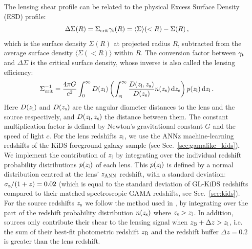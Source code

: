 \documentclass[usenatbib]{mnras}
\newcommand*{\meanb}[1]{\langle{#1}\rangle}
\newcommand{\un}[1]{_{\rm #1}}
\begin{document}
The lensing shear profile can be related to the physical Excess Surface Density (ESD) profile:
\begin{equation}
	\Delta \Sigma (R) = \Sigma\un{crit} \gamma\un{t}(R) = \meanb{\Sigma}(<R) - \Sigma(R) \, ,
	\label{eq:deltasigma}
\end{equation}
which is the surface density $\Sigma(R)$ at projected radius $R$, subtracted from the average surface density $\meanb{\Sigma(<R)}$ within $R$. The conversion factor between $\gamma\un{t}$ and $\Delta\Sigma$ is the critical surface density, whose inverse is also called the lensing efficiency:
\begin{equation}
	\Sigma\un{crit}^{-1} = \frac{4\pi G}{c^2} \int_{0}^{\infty} D(z\un{l}) \left( \int_{z\un{l}}^{\infty}  \frac{D(z\un{l}, z\un{s})}{D(z\un{s})} n(z\un{s}) \, {\rm d} z\un{s} \right) p(z\un{l}) \, {\rm d} z\un{l} \, .
	\label{eq:sigmacrit}
\end{equation}
Here $D(z\un{l})$ and $D(z\un{s})$ are the angular diameter distances to the lens and the source respectively, and $D(z\un{l}, z\un{s})$ the distance between them. The constant multiplication factor is defined by Newton's gravitational constant $G$ and the speed of light $c$. For the lens redshifts $z\un{l}$, we use the ANNz machine-learning redshifts of the KiDS foreground galaxy sample (see Sec.~\ref{sec:gamalike_kids}). We implement the contribution of $z\un{l}$ by integrating over the individual redshift probability distributions $p(z\un{l})$ of each lens. This $p(z\un{l})$ is defined by a normal distribution centred at the lens' $z\un{ANN}$ redshift, with a standard deviation: $\sigma\un{z}/(1+z) = 0.02$ (which is equal to the standard deviation of GL-KiDS redshifts compared to their matched spectroscopic GAMA redshifts, see Sec.~\ref{sec:kids}). For the source redshifts $z\un{s}$ we follow the method used in \cite{dvornik2018}, by integrating over the part of the redshift probability distribution $n(z\un{s})$ where $z\un{s}>z\un{l}$. In addition, sources only contribute their shear to the lensing signal when $z\un{B}+\Delta z > z\un{l}$, i.e. the sum of their best-fit photometric redshift $z\un{B}$ and the redshift buffer $\Delta z=0.2$ is greater than the lens redshift.
\end{document}
